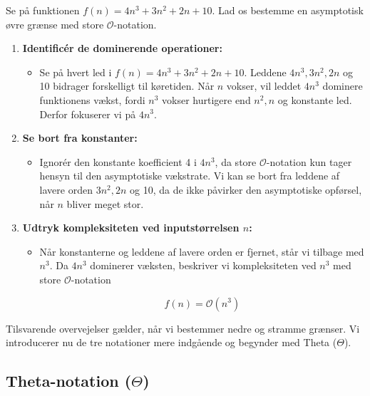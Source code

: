 \begin{example}

Se på funktionen $f(n)=4 n^3+3 n^2+2 n+10$. Lad os bestemme en asymptotisk øvre grænse med store $\mathcal{O}$-notation.
    \begin{enumerate}
        \item \textbf{Identificér de dominerende operationer:}
        \begin{itemize}
            \item Se på hvert led i $f(n)=4 n^3+3 n^2+2 n+10$.
            Leddene $4 n^3, 3 n^2, 2 n$ og 10 bidrager forskelligt til køretiden.
            Når $n$ vokser, vil leddet $4 n^3$ dominere funktionens vækst, fordi $n^3$ vokser hurtigere end $n^2, n$ og konstante led. Derfor fokuserer vi på $4 n^3$.
        \end{itemize}
        \item \textbf{Se bort fra konstanter:}
        \begin{itemize}
            \item Ignorér den konstante koefficient 4 i $4 n^3$, da store $\mathcal{O}$-notation kun tager hensyn til den asymptotiske vækstrate.
            Vi kan se bort fra leddene af lavere orden $3 n^2, 2 n$ og 10, da de ikke påvirker den asymptotiske opførsel, når $n$ bliver meget stor.
        \end{itemize}
        \item \textbf{Udtryk kompleksiteten ved inputstørrelsen $n$:}
        \begin{itemize}
            \item Når konstanterne og leddene af lavere orden er fjernet, står vi tilbage med $n^3$.
            Da $4 n^3$ dominerer væksten, beskriver vi kompleksiteten ved $n^3$ med store $\mathcal{O}$-notation

            \[
                f(n)=\mathcal{O}\left(n^3\right)
            \]
        \end{itemize}
    \end{enumerate}
\end{example}

Tilsvarende overvejelser gælder, når vi bestemmer nedre og stramme grænser. Vi introducerer nu de tre notationer mere indgående og begynder med Theta ($\Theta$).

\subsection*{Theta-notation (\texorpdfstring{$\Theta$}{Theta})}


